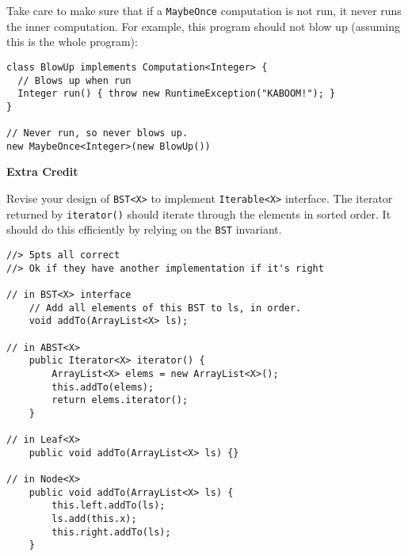 \documentclass[12pt]{article}                   %
\def\pts#1{\marginpar{\footnotesize \raggedright  \fbox{#1 {\sc Points}}}}
\newenvironment{solution}{\color{Red}}{}
\begin{document}
\begin{problem}
\begin{enumerate}
Take care to make sure that if a \texttt{MaybeOnce} computation is not
run, it never runs the inner computation.  For example, 
this program should not blow up (assuming this is the whole program):

\begin{verbatim}
class BlowUp implements Computation<Integer> {
  // Blows up when run
  Integer run() { throw new RuntimeException("KABOOM!"); }
}

// Never run, so never blows up.
new MaybeOnce<Integer>(new BlowUp())
\end{verbatim}
\end{enumerate}

\ifrubric
\else
{}
\fi
\newpage
\newpage

\end{problem}

\ifrubric
\else
{}
\fi
\newpage

\begin{problem}  \pts{5}

{\bf Extra Credit}

\noindent
Revise your design of \texttt{BST<X>} to implement
 \texttt{Iterable<X>} interface.  The iterator returned by
 \texttt{iterator()} should iterate through the elements in sorted order.
 It should do this efficiently by relying on the \texttt{BST} invariant.

\begin{solution}
\begin{verbatim}
//> 5pts all correct
//> Ok if they have another implementation if it's right

// in BST<X> interface
    // Add all elements of this BST to ls, in order.
    void addTo(ArrayList<X> ls);

// in ABST<X>
    public Iterator<X> iterator() {
        ArrayList<X> elems = new ArrayList<X>();
        this.addTo(elems);
        return elems.iterator();
    }

// in Leaf<X>
    public void addTo(ArrayList<X> ls) {}

// in Node<X>
    public void addTo(ArrayList<X> ls) {
        this.left.addTo(ls);
        ls.add(this.x);
        this.right.addTo(ls);
    }
\end{verbatim}
\end{solution}

\end{problem}

\end{document}
